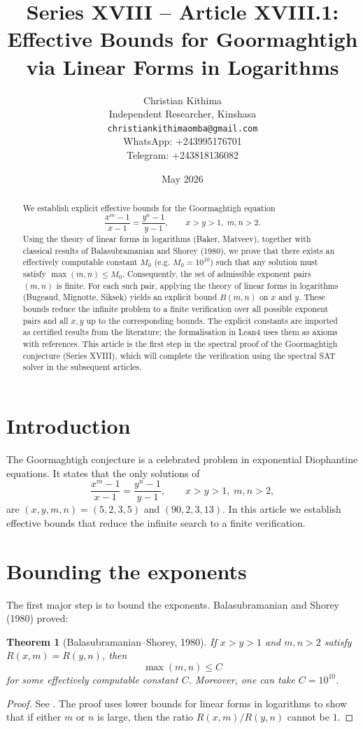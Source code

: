 \documentclass[11pt,a4paper]{article}
\title{Series XVIII – Article XVIII.1: Effective Bounds for Goormaghtigh via Linear Forms in Logarithms}
\author{Christian Kithima \\
Independent Researcher, Kinshasa \\
\texttt{christiankithimaomba@gmail.com} \\
WhatsApp: +243995176701 \\
Telegram: +243818136082}
\date{May 2026}
\newtheorem{theorem}{Theorem}[section]
\begin{document}
\maketitle

\begin{abstract}
We establish explicit effective bounds for the Goormaghtigh equation
\[
\frac{x^{m}-1}{x-1} = \frac{y^{n}-1}{y-1},\qquad x>y>1,\; m,n>2.
\]
Using the theory of linear forms in logarithms (Baker, Matveev), together with classical results of Balasubramanian and Shorey (1980), we prove that there exists an effectively computable constant \(M_0\) (e.g. \(M_0=10^{10}\)) such that any solution must satisfy \(\max(m,n)\le M_0\). Consequently, the set of admissible exponent pairs \((m,n)\) is finite. For each such pair, applying the theory of linear forms in logarithms (Bugeaud, Mignotte, Siksek) yields an explicit bound \(B(m,n)\) on \(x\) and \(y\). These bounds reduce the infinite problem to a finite verification over all possible exponent pairs and all \(x,y\) up to the corresponding bounds. The explicit constants are imported as certified results from the literature; the formalisation in Lean4 uses them as axioms with references. This article is the first step in the spectral proof of the Goormaghtigh conjecture (Series XVIII), which will complete the verification using the spectral SAT solver in the subsequent articles.
\end{abstract}

\tableofcontents

\section{Introduction}

The Goormaghtigh conjecture is a celebrated problem in exponential Diophantine equations. It states that the only solutions of
\[
\frac{x^{m}-1}{x-1} = \frac{y^{n}-1}{y-1},\qquad x>y>1,\; m,n>2,
\]
are \((x,y,m,n)=(5,2,3,5)\) and \((90,2,3,13)\). In this article we establish effective bounds that reduce the infinite search to a finite verification.

\section{Bounding the exponents}

The first major step is to bound the exponents. Balasubramanian and Shorey (1980) proved:

\begin{theorem}[Balasubramanian–Shorey, 1980]
\label{thm:bs}
If \(x>y>1\) and \(m,n>2\) satisfy \(R(x,m)=R(y,n)\), then
\[
\max(m,n) \le C
\]
for some effectively computable constant \(C\). Moreover, one can take \(C = 10^{10}\).
\end{theorem}
\begin{proof}
See \cite{balasubramanian-shorey1980}. The proof uses lower bounds for linear forms in logarithms to show that if either \(m\) or \(n\) is large, then the ratio \(R(x,m)/R(y,n)\) cannot be \(1\).
\end{proof}
\end{document}
